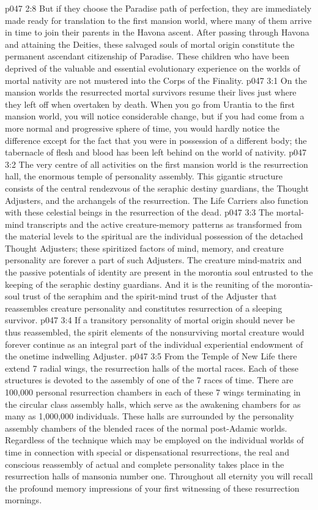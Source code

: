 \vs p047 2:8 But if they choose the Paradise path of perfection, they are immediately made ready for translation to the first mansion world, where many of them arrive in time to join their parents in the Havona ascent. After passing through Havona and attaining the Deities, these salvaged souls of mortal origin constitute the permanent ascendant citizenship of Paradise. These children who have been deprived of the valuable and essential evolutionary experience on the worlds of mortal nativity are not mustered into the Corps of the Finality.
\vs p047 3:1 On the mansion worlds the resurrected mortal survivors resume their lives just where they left off when overtaken by death. When you go from Urantia to the first mansion world, you will notice considerable change, but if you had come from a more normal and progressive sphere of time, you would hardly notice the difference except for the fact that you were in possession of a different body; the tabernacle of flesh and blood has been left behind on the world of nativity.
\vs p047 3:2 The very centre of all activities on the first mansion world is the resurrection hall, the enormous temple of personality assembly. This gigantic structure consists of the central rendezvous of the seraphic destiny guardians, the Thought Adjusters, and the archangels of the resurrection. The Life Carriers also function with these celestial beings in the resurrection of the dead.
\vs p047 3:3 The mortal\hyp{}mind transcripts and the active creature\hyp{}memory patterns as transformed from the material levels to the spiritual are the individual possession of the detached Thought Adjusters; these spiritized factors of mind, memory, and creature personality are forever a part of such Adjusters. The creature mind\hyp{}matrix and the passive potentials of identity are present in the morontia soul entrusted to the keeping of the seraphic destiny guardians. And it is the reuniting of the morontia\hyp{}soul trust of the seraphim and the spirit\hyp{}mind trust of the Adjuster that reassembles creature personality and constitutes resurrection of a sleeping survivor.
\vs p047 3:4 If a transitory personality of mortal origin should never be thus reassembled, the spirit elements of the nonsurviving mortal creature would forever continue as an integral part of the individual experiential endowment of the onetime indwelling Adjuster.
\vs p047 3:5 From the Temple of New Life there extend 7 radial wings, the resurrection halls of the mortal races. Each of these structures is devoted to the assembly of one of the 7 races of time. There are 100,000 personal resurrection chambers in each of these 7 wings terminating in the circular class assembly halls, which serve as the awakening chambers for as many as 1,000,000 individuals. These halls are surrounded by the personality assembly chambers of the blended races of the normal post\hyp{}Adamic worlds. Regardless of the technique which may be employed on the individual worlds of time in connection with special or dispensational resurrections, the real and conscious reassembly of actual and complete personality takes place in the resurrection halls of mansonia number one. Throughout all eternity you will recall the profound memory impressions of your first witnessing of these resurrection mornings.

